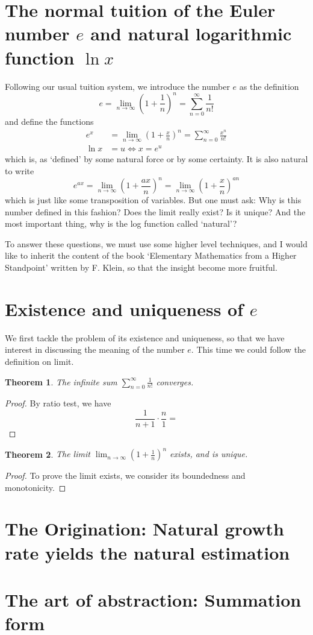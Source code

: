 \documentclass[12pt]{article}
\newtheorem*{theorem}{Theorem}
\begin{document}
    \section{The normal tuition of the Euler number $e$ and natural logarithmic function $\ln x$}
    Following our usual tuition system, we introduce the number $e$ as the definition $$e=\lim_{n\to \infty}(1+\frac{1}{n})^n=\sum_{n=0}^\infty \frac{1}{n!}$$ and define the functions \begin{align*}
        e^x&=\lim_{n\to \infty}(1+\frac{x}{n})^n=\sum_{n=0}^\infty \frac{x^n}{n!}\\
        \ln{x}&=u \iff x=e^u
    \end{align*}which is, as `defined' by some natural force or by some certainty. It is also natural to write $$e^{ax}=\lim_{n\to \infty}(1+\frac{ax}{n})^n=\lim_{n\to \infty}(1+\frac{x}{n})^{an}$$ which is just like some transposition of variables. But one must ask: Why is this number defined in this fashion? Does the limit really exist? Is it unique? And the most important thing, why is the log function called `natural'?

    To answer these questions, we must use some higher level techniques, and I would like to inherit the content of the book `Elementary Mathematics from a Higher Standpoint' written by F. Klein, so that the insight become more fruitful.

    \section{Existence and uniqueness of $e$}
    We first tackle the problem of its existence and uniqueness, so that we have interest in discussing the meaning of the number $e$. This time we could follow the definition on limit.

    

    \begin{theorem}
        The infinite sum $\sum_{n=0}^\infty \frac{1}{n!}$ converges.
    \end{theorem}
    \begin{proof}
        By ratio test, we have \[\frac{1}{n+1}\cdot \frac{n}{1}=\]
    \end{proof}

    \begin{theorem}
        The limit $\lim_{n\to \infty}(1+\frac{1}{n})^n$ exists, and is unique.
    \end{theorem}
    \begin{proof}
        To prove the limit exists, we consider its boundedness and monotonicity. 
    \end{proof}

    \section{The Origination: Natural growth rate yields the natural estimation}

    \section{The art of abstraction: Summation form}
\end{document}

